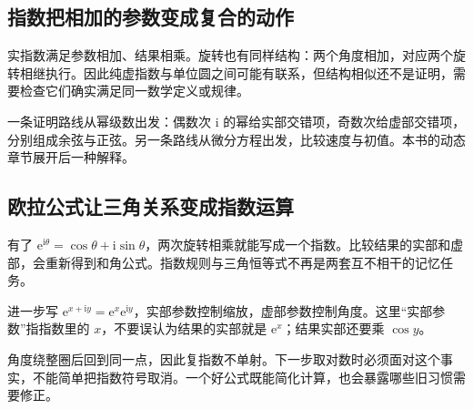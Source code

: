 \subsection*{指数把相加的参数变成复合的动作}
实指数满足参数相加、结果相乘。旋转也有同样结构：两个角度相加，对应两个旋转相继执行。因此纯虚指数与单位圆之间可能有联系，但结构相似还不是证明，需要检查它们确实满足同一数学定义或规律。

一条证明路线从幂级数出发：偶数次 $\mathrm i$ 的幂给实部交错项，奇数次给虚部交错项，分别组成余弦与正弦。另一条路线从微分方程出发，比较速度与初值。本书的动态章节展开后一种解释。

\subsection*{欧拉公式让三角关系变成指数运算}
有了 $\mathrm e^{\mathrm i\theta}=\cos\theta+\mathrm i\sin\theta$，两次旋转相乘就能写成一个指数。比较结果的实部和虚部，会重新得到和角公式。指数规则与三角恒等式不再是两套互不相干的记忆任务。

进一步写 $\mathrm e^{x+\mathrm i y}=\mathrm e^x\mathrm e^{\mathrm i y}$，实部参数控制缩放，虚部参数控制角度。这里“实部参数”指指数里的 $x$，不要误认为结果的实部就是 $\mathrm e^x$；结果实部还要乘 $\cos y$。

角度绕整圈后回到同一点，因此复指数不单射。下一步取对数时必须面对这个事实，不能简单把指数符号取消。一个好公式既能简化计算，也会暴露哪些旧习惯需要修正。
